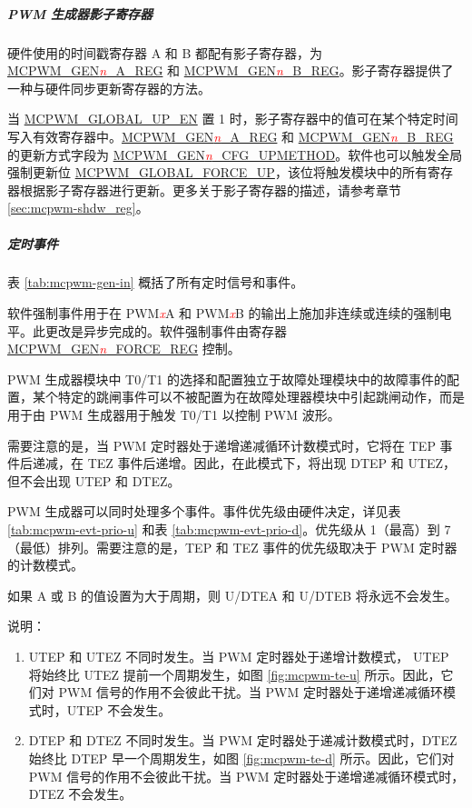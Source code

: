 \documentclass[main\_\_CN.tex]{subfiles}
\begin{document}
\subparagraph{PWM 生成器影子寄存器}
\label{subpara:mcpwm-op-shadow}
硬件使用的时间戳寄存器 A 和 B 都配有影子寄存器，为 \hyperref[regdesc:MCPWMGENNAREG]{MCPWM\_GEN\textcolor{red}{\it{n}}\_A\_REG} 和 \hyperref[regdesc:MCPWMGENNBREG]{MCPWM\_GEN\textcolor{red}{\it{n}}\_B\_REG}。影子寄存器提供了一种与硬件同步更新寄存器的方法。

当 \hyperref[fielddesc:MCPWMGLOBALUPEN]{MCPWM\_GLOBAL\_UP\_EN} 置 1 时，影子寄存器中的值可在某个特定时间写入有效寄存器中。\hyperref[regdesc:MCPWMGENNAREG]{MCPWM\_GEN\textcolor{red}{\it{n}}\_A\_REG} 和 \hyperref[regdesc:MCPWMGENNBREG]{MCPWM\_GEN\textcolor{red}{\it{n}}\_B\_REG} 的更新方式字段为 \hyperref[fielddesc:MCPWMGENNCFGUPMETHOD]{MCPWM\_GEN\textcolor{red}{\it{n}}\_CFG\_UPMETHOD}。软件也可以触发全局强制更新位 \hyperref[fielddesc:MCPWMGLOBALFORCEUP]{MCPWM\_GLOBAL\_FORCE\_UP}，该位将触发模块中的所有寄存器根据影子寄存器进行更新。更多关于影子寄存器的描述，请参考章节 \ref{sec:mcpwm-shdw_reg}。

\subparagraph{定时事件}
\label{subpara:mcpwm-op-evt}
表 \ref{tab:mcpwm-gen-in} 概括了所有定时信号和事件。



软件强制事件用于在 PWM\textcolor{red}{\it{x}}A 和 PWM\textcolor{red}{\it{x}}B 的输出上施加非连续或连续的强制电平。此更改是异步完成的。软件强制事件由寄存器 \hyperref[regdesc:MCPWMGENNFORCEREG]{MCPWM\_GEN\textcolor{red}{\it{n}}\_FORCE\_REG} 控制。

PWM 生成器模块中 T0/T1 的选择和配置独立于故障处理模块中的故障事件的配置，某个特定的跳闸事件可以不被配置为在故障处理器模块中引起跳闸动作，而是用于由 PWM 生成器用于触发 T0/T1 以控制 PWM 波形。

需要注意的是，当 PWM 定时器处于递增递减循环计数模式时，它将在 TEP 事件后递减，在 TEZ 事件后递增。因此，在此模式下，将出现 DTEP 和 UTEZ，但不会出现 UTEP 和 DTEZ。

PWM 生成器可以同时处理多个事件。事件优先级由硬件决定，详见表 \ref{tab:mcpwm-evt-prio-u} 和表 \ref{tab:mcpwm-evt-prio-d}。优先级从 1（最高）到 7（最低）排列。需要注意的是，TEP 和 TEZ 事件的优先级取决于 PWM 定时器的计数模式。

如果 A 或 B 的值设置为大于周期，则 U/DTEA 和 U/DTEB 将永远不会发生。




说明：
\begin{enumerate}
    \item UTEP 和 UTEZ 不同时发生。当 PWM 定时器处于递增计数模式， UTEP 将始终比 UTEZ 提前一个周期发生，如图 \ref{fig:mcpwm-te-u} 所示。因此，它们对 PWM 信号的作用不会彼此干扰。当 PWM 定时器处于递增递减循环模式时，UTEP 不会发生。
    \item DTEP 和 DTEZ 不同时发生。当 PWM 定时器处于递减计数模式时，DTEZ 始终比 DTEP 早一个周期发生，如图 \ref{fig:mcpwm-te-d} 所示。因此，它们对 PWM 信号的作用不会彼此干扰。当 PWM 定时器处于递增递减循环模式时，DTEZ 不会发生。
\end{enumerate}
\end{document}
